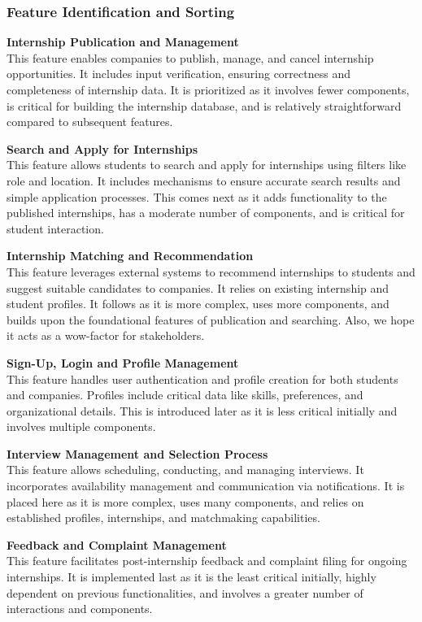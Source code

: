 \subsubsection{Feature Identification and Sorting}
\begin{enumerate}[label={[F\arabic*]}]
    \item \textbf{Internship Publication and Management} \\ This feature enables companies to publish, manage, and cancel internship opportunities. It includes input verification, ensuring correctness and completeness of internship data. It is prioritized as it involves fewer components, is critical for building the internship database, and is relatively straightforward compared to subsequent features.
    \item \textbf{Search and Apply for Internships} \\ This feature allows students to search and apply for internships using filters like role and location. It includes mechanisms to ensure accurate search results and simple application processes. This comes next as it adds functionality to the published internships, has a moderate number of components, and is critical for student interaction.
    \item \textbf{Internship Matching and Recommendation} \\  This feature leverages external systems to recommend internships to students and suggest suitable candidates to companies. It relies on existing internship and student profiles. It follows as it is more complex, uses more components, and builds upon the foundational features of publication and searching. Also, we hope it acts as a wow-factor for stakeholders.
    \item \textbf{Sign-Up, Login and Profile Management}\\ This feature handles user authentication and profile creation for both students and companies. Profiles include critical data like skills, preferences, and organizational details. This is introduced later as it is less critical initially and involves multiple components.
    \item \textbf{Interview Management and Selection Process} \\ This feature allows scheduling, conducting, and managing interviews. It incorporates availability management and communication via notifications. It is placed here as it is more complex, uses many components, and relies on established profiles, internships, and matchmaking capabilities.
    \item \textbf{Feedback and Complaint Management} \\ This feature facilitates post-internship feedback and complaint filing for ongoing internships. It is implemented last as it is the least critical initially, highly dependent on previous functionalities, and involves a greater number of interactions and components.
\end{enumerate}


